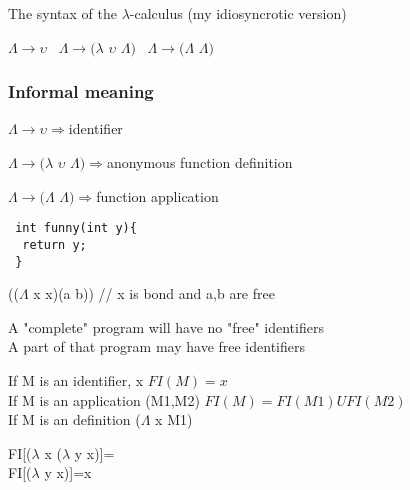 \documentclass{article}
\begin{document}
\begin{flushleft}
\begin{flushleft}
The syntax of the $\lambda$-calculus (my idiosyncrotic version)
\end{flushleft}

\begin{flushleft}
\center
$\Lambda\rightarrow\upsilon$\
\center
$\Lambda\rightarrow(\lambda$ 
$\upsilon$
$\Lambda)$\
\center
$\Lambda\rightarrow(\Lambda$
$\Lambda)$
\
\end{flushleft}

\begin{flushleft}
\subsubsection*{Informal meaning}
\end{flushleft}
\begin{flushleft}

$\Lambda\rightarrow\upsilon\Longrightarrow$identifier

$\Lambda\rightarrow(\lambda$ 
$\upsilon$
$\Lambda)\Longrightarrow$anonymous function definition

$\Lambda\rightarrow(\Lambda$
$\Lambda)\Longrightarrow$function application
\end{flushleft}


\begin{verbatim} 
 int funny(int y){ 
  return y;
 } 
\end{verbatim}
%
\begin{flushleft}
(($\Lambda$ x x)(a b)) // x is bond and a,b are free
\end{flushleft}

\begin{flushleft}
A "complete" program will have no "free" identifiers\\
A part of that program may have free identifiers
\end{flushleft}

\begin{flushleft}
If M is an identifier, x $FI(M)={x}$\\
If M is an application (M1,M2) $FI(M)=FI(M1) U FI(M2)$\\
If M is an definition ($\Lambda$ x M1)
\end{flushleft}

\begin{flushleft}
FI[($\lambda$ x ($\lambda$ y x)]={}\\
FI[($\lambda$ y x)]={x}
\end{flushleft}



\end{flushleft}
\end{document}
